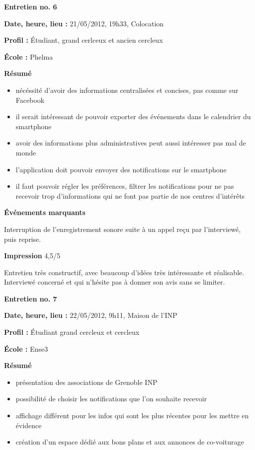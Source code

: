 \documentclass[a4paper, 11px]{article}
\begin{document}


\vspace{.3cm}

 \textbf {\large Entretien no. 6}

\textbf{Date, heure, lieu : }
21/05/2012, 19h33, Colocation

\textbf{Profil : }
Étudiant, grand cerlceux et ancien cercleux


\textbf{École : }
Phelma

\textbf{Résumé}
	\begin{itemize}
		\item nécéssité d'avoir des informations centralisées et concises, pas comme sur Facebook
		\item il serait intéressant de pouvoir exporter des événements dans le calendrier du smartphone
		\item avoir des informations plus administratives peut aussi intéresser pas mal de monde
		\item l'application doit pouvoir envoyer des notifications sur le smartphone
		\item il faut pouvoir régler les préférences, filtrer les notifications pour ne pas recevoir trop d'informations qui ne font pas partie de nos centres d'intérêts
	\end{itemize}
\vspace{.25cm}


\textbf{Événements marquants}

Interruption de l'enregistrement sonore suite à un appel reçu par l'interviewé, puis reprise.

\textbf{Impression} 4,5/5

Entretien très constructif, avec beaucoup d'idées très intéressante et réalisable. Interviewé concerné et qui n'hésite pas à donner son avis sans se limiter.




\vspace{.3cm}

 \textbf {\large Entretien no. 7}

\textbf{Date, heure, lieu : }
22/05/2012, 9h11, Maison de l'INP

\textbf{Profil : }
Étudiant grand cercleux et cercleux


\textbf{École : }
Ense3

\textbf{Résumé}
	\begin{itemize}
		\item présentation des associations de Grenoble INP
		\item possibilité de choisir les notifications que l'on souhaite recevoir
		\item affichage différent pour les infos qui sont les plus récentes pour les mettre en évidence
		\item création d'un espace dédié aux bons plans et aux annonces de co-voiturage
	\end{itemize}
\vspace{.25cm}
\end{document}
